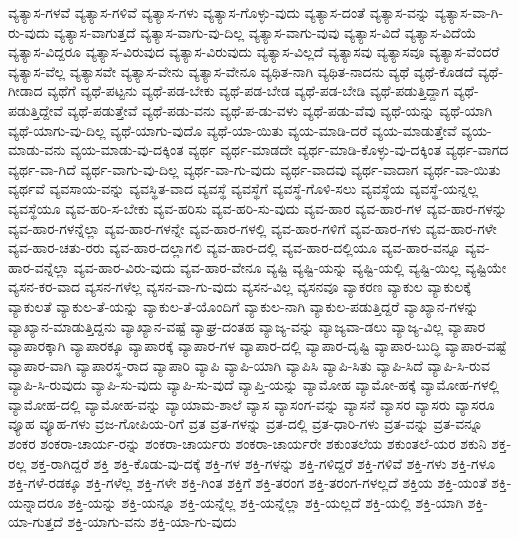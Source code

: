 {ವ್ಯತ್ಯಾಸ-ಗಳವೆ
ವ್ಯತ್ಯಾಸ-ಗಳಿವೆ
ವ್ಯತ್ಯಾಸ-ಗಳು
ವ್ಯತ್ಯಾಸ-ಗೊಳ್ಳು-ವುದು
ವ್ಯತ್ಯಾಸ-ದಂತೆ
ವ್ಯತ್ಯಾಸ-ವನ್ನು
ವ್ಯತ್ಯಾಸ-ವಾ-ಗಿ-ರು-ವುದು
ವ್ಯತ್ಯಾಸ-ವಾಗುತ್ತದೆ
ವ್ಯತ್ಯಾಸ-ವಾಗು-ವು-ದಿಲ್ಲ
ವ್ಯತ್ಯಾಸ-ವಾಗು-ವುವು
ವ್ಯತ್ಯಾಸ-ವಿದೆ
ವ್ಯತ್ಯಾಸ-ವಿದೆಯೆ
ವ್ಯತ್ಯಾಸ-ವಿದ್ದರೂ
ವ್ಯತ್ಯಾಸ-ವಿರುವುದ
ವ್ಯತ್ಯಾಸ-ವಿರುವುದು
ವ್ಯತ್ಯಾಸ-ವಿಲ್ಲದೆ
ವ್ಯತ್ಯಾಸವು
ವ್ಯತ್ಯಾಸವೂ
ವ್ಯತ್ಯಾಸ-ವೆಂದರೆ
ವ್ಯತ್ಯಾಸ-ವೆಲ್ಲ
ವ್ಯತ್ಯಾಸವೇ
ವ್ಯತ್ಯಾಸ-ವೇನು
ವ್ಯತ್ಯಾಸ-ವೇನೂ
ವ್ಯಥಿತ-ನಾಗಿ
ವ್ಯಥಿತ-ನಾದನು
ವ್ಯಥೆ
ವ್ಯಥೆ-ಕೊಡದೆ
ವ್ಯಥೆ-ಗೀಡಾದ
ವ್ಯಥೆಗೆ
ವ್ಯಥೆ-ಪಟ್ಟನು
ವ್ಯಥೆ-ಪಡ-ಬೇಕು
ವ್ಯಥೆ-ಪಡ-ಬೇಡ
ವ್ಯಥೆ-ಪಡ-ಬೇಡಿ
ವ್ಯಥೆ-ಪಡುತ್ತಿದ್ದಾಗ
ವ್ಯಥೆ-ಪಡುತ್ತಿದ್ದೇವೆ
ವ್ಯಥೆ-ಪಡುತ್ತೇವೆ
ವ್ಯಥೆ-ಪಡು-ವನು
ವ್ಯಥೆ-ಪ-ಡು-ವಳು
ವ್ಯಥೆ-ಪಡು-ವೆವು
ವ್ಯಥೆ-ಯನ್ನು
ವ್ಯಥೆ-ಯಾಗಿ
ವ್ಯಥೆ-ಯಾಗು-ವು-ದಿಲ್ಲ
ವ್ಯಥೆ-ಯಾಗು-ವುದೊ
ವ್ಯಥೆ-ಯಾ-ಯಿತು
ವ್ಯಯ-ಮಾಡಿ-ದರೆ
ವ್ಯಯ-ಮಾಡುತ್ತೇವೆ
ವ್ಯಯ-ಮಾಡು-ವನು
ವ್ಯಯ-ಮಾಡು-ವು-ದಕ್ಕಿಂತ
ವ್ಯರ್ಥ
ವ್ಯರ್ಥ-ಮಾಡದೇ
ವ್ಯರ್ಥ-ಮಾಡಿ-ಕೊಳ್ಳು-ವು-ದಕ್ಕಿಂತ
ವ್ಯರ್ಥ-ವಾಗದ
ವ್ಯರ್ಥ-ವಾ-ಗಿದೆ
ವ್ಯರ್ಥ-ವಾಗು-ವು-ದಿಲ್ಲ
ವ್ಯರ್ಥ-ವಾ-ಗು-ವುದು
ವ್ಯರ್ಥ-ವಾದವು
ವ್ಯರ್ಥ-ವಾದಾಗ
ವ್ಯರ್ಥ-ವಾ-ಯಿತು
ವ್ಯರ್ಥವೆ
ವ್ಯವಸಾಯ-ವನ್ನು
ವ್ಯವಸ್ಥಿತ-ವಾದ
ವ್ಯವಸ್ಥೆ
ವ್ಯವಸ್ಥೆಗೆ
ವ್ಯವಸ್ಥೆ-ಗೊಳಿ-ಸಲು
ವ್ಯವಸ್ಥೆಯ
ವ್ಯವಸ್ಥೆ-ಯನ್ನಲ್ಲ
ವ್ಯವಸ್ಥೆಯೂ
ವ್ಯವ-ಹರಿ-ಸ-ಬೇಕು
ವ್ಯವ-ಹರಿಸು
ವ್ಯವ-ಹರಿ-ಸು-ವುದು
ವ್ಯವ-ಹಾರ
ವ್ಯವ-ಹಾರ-ಗಳ
ವ್ಯವ-ಹಾರ-ಗಳನ್ನು
ವ್ಯವ-ಹಾರ-ಗಳನ್ನೆಲ್ಲಾ
ವ್ಯವ-ಹಾರ-ಗಳನ್ನೇ
ವ್ಯವ-ಹಾರ-ಗಳಲ್ಲಿ
ವ್ಯವ-ಹಾರ-ಗಳಿಗೆ
ವ್ಯವ-ಹಾರ-ಗಳು
ವ್ಯವ-ಹಾರ-ಗಳೇ
ವ್ಯವ-ಹಾರ-ಚತು-ರರು
ವ್ಯವ-ಹಾರ-ದಲ್ಲಾಗಲಿ
ವ್ಯವ-ಹಾರ-ದಲ್ಲಿ
ವ್ಯವ-ಹಾರ-ದಲ್ಲಿಯೂ
ವ್ಯವ-ಹಾರ-ವನ್ನೂ
ವ್ಯವ-ಹಾರ-ವನ್ನೆಲ್ಲಾ
ವ್ಯವ-ಹಾರ-ವಿರು-ವುದು
ವ್ಯವ-ಹಾರ-ವೇನೂ
ವ್ಯಷ್ಟಿ
ವ್ಯಷ್ಟಿ-ಯನ್ನು
ವ್ಯಷ್ಟಿ-ಯಲ್ಲಿ
ವ್ಯಷ್ಟಿ-ಯಿಲ್ಲ
ವ್ಯಷ್ಟಿಯೇ
ವ್ಯಸನ-ಕರ-ವಾದ
ವ್ಯಸನ-ಗಳೆಲ್ಲ
ವ್ಯಸನ-ವಾ-ಗು-ವುದು
ವ್ಯಸನ-ವಿಲ್ಲ
ವ್ಯಸನವೂ
ವ್ಯಾಕರಣ
ವ್ಯಾಕುಲ
ವ್ಯಾಕುಲಕ್ಕೆ
ವ್ಯಾಕುಲತೆ
ವ್ಯಾಕುಲ-ತೆ-ಯನ್ನು
ವ್ಯಾಕುಲ-ತೆ-ಯೊಂದಿಗೆ
ವ್ಯಾಕುಲ-ನಾಗಿ
ವ್ಯಾಕುಲ-ಪಡುತ್ತಿದ್ದರೆ
ವ್ಯಾಖ್ಯಾನ-ಗಳನ್ನು
ವ್ಯಾಖ್ಯಾನ-ಮಾಡುತ್ತಿದ್ದನು
ವ್ಯಾಖ್ಯಾನ-ವಷ್ಟೆ
ವ್ಯಾಘ್ರ-ದಂತಹ
ವ್ಯಾಜ್ಯ-ವನ್ನು
ವ್ಯಾಜ್ಯವಾ-ಡಲು
ವ್ಯಾಜ್ಯ-ವಿಲ್ಲ
ವ್ಯಾಪಾರ
ವ್ಯಾಪಾರಕ್ಕಾಗಿ
ವ್ಯಾಪಾರಕ್ಕೂ
ವ್ಯಾಪಾರಕ್ಕೆ
ವ್ಯಾಪಾರ-ಗಳ
ವ್ಯಾಪಾರ-ದಲ್ಲಿ
ವ್ಯಾಪಾರ-ದೃಷ್ಟಿ
ವ್ಯಾಪಾರ-ಬುದ್ಧಿ
ವ್ಯಾಪಾರ-ವಷ್ಟೆ
ವ್ಯಾಪಾರ-ವಾಗಿ
ವ್ಯಾಪಾರಸ್ಥ-ರಾದ
ವ್ಯಾಪಾರಿ
ವ್ಯಾಪಿ
ವ್ಯಾಪಿ-ಯಾಗಿ
ವ್ಯಾಪಿಸಿ
ವ್ಯಾಪಿ-ಸಿತು
ವ್ಯಾಪಿ-ಸಿದೆ
ವ್ಯಾಪಿ-ಸಿ-ರುವ
ವ್ಯಾಪಿ-ಸಿ-ರುವುದು
ವ್ಯಾಪಿ-ಸು-ವುದು
ವ್ಯಾಪಿ-ಸು-ವುದೆ
ವ್ಯಾಪ್ತಿ-ಯನ್ನು
ವ್ಯಾಮೋಹ
ವ್ಯಾಮೋ-ಹಕ್ಕೆ
ವ್ಯಾಮೋಹ-ಗಳಲ್ಲಿ
ವ್ಯಾಮೋಹ-ದಲ್ಲಿ
ವ್ಯಾಮೋಹ-ವನ್ನು
ವ್ಯಾಯಾಮ-ಶಾಲೆ
ವ್ಯಾಸ
ವ್ಯಾಸಂಗ-ವನ್ನು
ವ್ಯಾಸನೆ
ವ್ಯಾಸರ
ವ್ಯಾಸರು
ವ್ಯಾಸರೂ
ವ್ಯೂಹ
ವ್ಯೂಹ-ಗಳು
ವ್ರಜ-ಗೋಪಿಯ-ರಿಗೆ
ವ್ರತ
ವ್ರತ-ಗಳನ್ನು
ವ್ರತ-ದಲ್ಲಿ
ವ್ರತ-ಧಾರಿ-ಗಳು
ವ್ರತ-ವನ್ನು
ವ್ರತ-ವನ್ನೂ
ಶಂಕರ
ಶಂಕರಾ-ಚಾರ್ಯ-ರನ್ನು
ಶಂಕರಾ-ಚಾರ್ಯರು
ಶಂಕರಾ-ಚಾರ್ಯರೇ
ಶಕುಂತಲೆಯ
ಶಕುಂತಲೆ-ಯರ
ಶಕುನಿ
ಶಕ್ತ-ರಲ್ಲ
ಶಕ್ತ-ರಾಗಿದ್ದರೆ
ಶಕ್ತಿ
ಶಕ್ತಿ-ಕೊಡು-ವು-ದಕ್ಕೆ
ಶಕ್ತಿ-ಗಳ
ಶಕ್ತಿ-ಗಳನ್ನು
ಶಕ್ತಿ-ಗಳಿದ್ದರೆ
ಶಕ್ತಿ-ಗಳಿವೆ
ಶಕ್ತಿ-ಗಳು
ಶಕ್ತಿ-ಗಳೂ
ಶಕ್ತಿ-ಗಳೆ-ರಡಕ್ಕೂ
ಶಕ್ತಿ-ಗಳೆಲ್ಲ
ಶಕ್ತಿ-ಗಳೇ
ಶಕ್ತಿ-ಗಿಂತ
ಶಕ್ತಿಗೆ
ಶಕ್ತಿ-ತರಂಗ
ಶಕ್ತಿ-ತರಂಗ-ಗಳಲ್ಲದೆ
ಶಕ್ತಿಯ
ಶಕ್ತಿ-ಯಂತೆ
ಶಕ್ತಿ-ಯನ್ನಾದರೂ
ಶಕ್ತಿ-ಯನ್ನು
ಶಕ್ತಿ-ಯನ್ನೂ
ಶಕ್ತಿ-ಯನ್ನೆಲ್ಲ
ಶಕ್ತಿ-ಯನ್ನೆಲ್ಲಾ
ಶಕ್ತಿ-ಯಲ್ಲದೆ
ಶಕ್ತಿ-ಯಲ್ಲಿ
ಶಕ್ತಿ-ಯಾಗಿ
ಶಕ್ತಿ-ಯಾ-ಗುತ್ತದೆ
ಶಕ್ತಿ-ಯಾಗು-ವನು
ಶಕ್ತಿ-ಯಾ-ಗು-ವುದು
}
